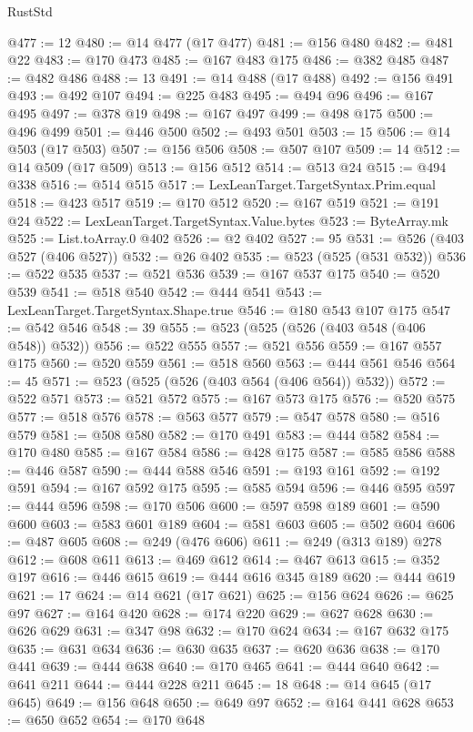 \begin{lexlean}{RustStd}
\begin{coremodule}
@477 := 12
@480 := @14 @477 (@17 @477)
@481 := @156 @480
@482 := @481 @22
@483 := @170 @473
@485 := @167 @483 @175
@486 := @382 @485
@487 := @482 @486
@488 := 13
@491 := @14 @488 (@17 @488)
@492 := @156 @491
@493 := @492 @107
@494 := @225 @483
@495 := @494 @96
@496 := @167 @495
@497 := @378 @19
@498 := @167 @497
@499 := @498 @175
@500 := @496 @499
@501 := @446 @500
@502 := @493 @501
@503 := 15
@506 := @14 @503 (@17 @503)
@507 := @156 @506
@508 := @507 @107
@509 := 14
@512 := @14 @509 (@17 @509)
@513 := @156 @512
@514 := @513 @24
@515 := @494 @338
@516 := @514 @515
@517 := LexLeanTarget.TargetSyntax.Prim.equal
@518 := @423 @517
@519 := @170 @512
@520 := @167 @519
@521 := @191 @24
@522 := LexLeanTarget.TargetSyntax.Value.bytes
@523 := ByteArray.mk
@525 := List.toArray.{0} @402
@526 := @2 @402
@527 := 95
@531 := @526 (@403 @527 (@406 @527))
@532 := @26 @402
@535 := @523 (@525 (@531 @532))
@536 := @522 @535
@537 := @521 @536
@539 := @167 @537 @175
@540 := @520 @539
@541 := @518 @540
@542 := @444 @541
@543 := LexLeanTarget.TargetSyntax.Shape.true
@546 := @180 @543 @107 @175
@547 := @542 @546
@548 := 39
@555 := @523 (@525 (@526 (@403 @548 (@406 @548)) @532))
@556 := @522 @555
@557 := @521 @556
@559 := @167 @557 @175
@560 := @520 @559
@561 := @518 @560
@563 := @444 @561 @546
@564 := 45
@571 := @523 (@525 (@526 (@403 @564 (@406 @564)) @532))
@572 := @522 @571
@573 := @521 @572
@575 := @167 @573 @175
@576 := @520 @575
@577 := @518 @576
@578 := @563 @577
@579 := @547 @578
@580 := @516 @579
@581 := @508 @580
@582 := @170 @491
@583 := @444 @582
@584 := @170 @480
@585 := @167 @584
@586 := @428 @175
@587 := @585 @586
@588 := @446 @587
@590 := @444 @588 @546
@591 := @193 @161
@592 := @192 @591
@594 := @167 @592 @175
@595 := @585 @594
@596 := @446 @595
@597 := @444 @596
@598 := @170 @506
@600 := @597 @598 @189
@601 := @590 @600
@603 := @583 @601 @189
@604 := @581 @603
@605 := @502 @604
@606 := @487 @605
@608 := @249 (@476 @606)
@611 := @249 (@313 @189) @278
@612 := @608 @611
@613 := @469 @612
@614 := @467 @613
@615 := @352 @197
@616 := @446 @615
@619 := @444 @616 @345 @189
@620 := @444 @619
@621 := 17
@624 := @14 @621 (@17 @621)
@625 := @156 @624
@626 := @625 @97
@627 := @164 @420
@628 := @174 @220
@629 := @627 @628
@630 := @626 @629
@631 := @347 @98
@632 := @170 @624
@634 := @167 @632 @175
@635 := @631 @634
@636 := @630 @635
@637 := @620 @636
@638 := @170 @441
@639 := @444 @638
@640 := @170 @465
@641 := @444 @640
@642 := @641 @211
@644 := @444 @228 @211
@645 := 18
@648 := @14 @645 (@17 @645)
@649 := @156 @648
@650 := @649 @97
@652 := @164 @441 @628
@653 := @650 @652
@654 := @170 @648

\end{coremodule}
\end{lexlean}
